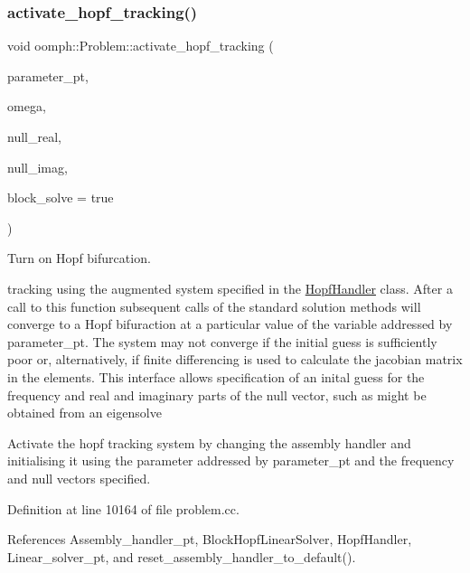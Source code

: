 \subsubsection{\texorpdfstring{activate\+\_\+hopf\+\_\+tracking()}{activate\_hopf\_tracking()}\hspace{0.1cm}{\footnotesize\ttfamily [2/2]}}
{\footnotesize\ttfamily void oomph\+::\+Problem\+::activate\+\_\+hopf\+\_\+tracking (\begin{DoxyParamCaption}\item[{double $\ast$const \&}]{parameter\+\_\+pt,  }\item[{const double \&}]{omega,  }\item[{const \hyperlink{classoomph_1_1DoubleVector}{Double\+Vector} \&}]{null\+\_\+real,  }\item[{const \hyperlink{classoomph_1_1DoubleVector}{Double\+Vector} \&}]{null\+\_\+imag,  }\item[{const bool \&}]{block\+\_\+solve = {\ttfamily true} }\end{DoxyParamCaption})}



Turn on Hopf bifurcation. 

tracking using the augmented system specified in the \hyperlink{classoomph_1_1HopfHandler}{Hopf\+Handler} class. After a call to this function subsequent calls of the standard solution methods will converge to a Hopf bifuraction at a particular value of the variable addressed by parameter\+\_\+pt. The system may not converge if the initial guess is sufficiently poor or, alternatively, if finite differencing is used to calculate the jacobian matrix in the elements. This interface allows specification of an inital guess for the frequency and real and imaginary parts of the null vector, such as might be obtained from an eigensolve

Activate the hopf tracking system by changing the assembly handler and initialising it using the parameter addressed by parameter\+\_\+pt and the frequency and null vectors specified. 

Definition at line 10164 of file problem.\+cc.



References Assembly\+\_\+handler\+\_\+pt, Block\+Hopf\+Linear\+Solver, Hopf\+Handler, Linear\+\_\+solver\+\_\+pt, and reset\+\_\+assembly\+\_\+handler\+\_\+to\+\_\+default().

\mbox{\label{classoomph_1_1Problem_a7f5eb1f88a957cb3d8a11b558002d484}} 
